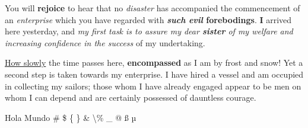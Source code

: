 \documentclass{article}
\begin{document}
You will \textbf{rejoice} to hear that no \emph{disaster} has accompanied the
commencement of an \textit{enterprise} which you have regarded with \textbf{\emph{such} \textit{evil}
forebodings}.  \textbf{I} arrived here yesterday, and \textit{my first task is to assure
my dear \textbf{sister} of my welfare and increasing \emph{confidence in} the success}
of my undertaking.


\underline{How slowly} the time passes here, \textbf{encompassed} as I am by frost and snow! Yet a second step is taken towards my enterprise.  
I have hired a vessel and am occupied in collecting my sailors; those whom I have already engaged appear to be men on whom 
I can depend and are certainly possessed of dauntless courage.

Hola Mundo \# \$ \{ \} \& \textbackslash \% \_ @ ß µ 
\end{document}
